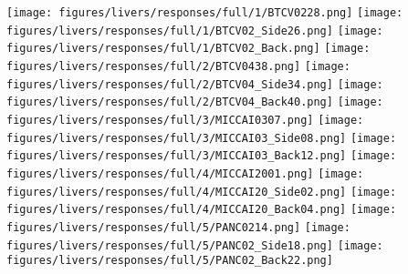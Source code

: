 \documentclass[journal]{IEEEtran}
\begin{document}
\begin{figure*}[tb]
    \centering
        \begin{minipage}[b]{3.5in}
            \captionsetup[subfigure]{labelformat=parens,labelsep=space,font=small}
            \centering
                \vfil
                \texttt{[image: figures/livers/responses/full/1/BTCV0228.png]}
                \texttt{[image: figures/livers/responses/full/1/BTCV02\_Side26.png]}
                \texttt{[image: figures/livers/responses/full/1/BTCV02\_Back.png]}
                \vfil
                \texttt{[image: figures/livers/responses/full/2/BTCV0438.png]}
                \texttt{[image: figures/livers/responses/full/2/BTCV04\_Side34.png]}
                \texttt{[image: figures/livers/responses/full/2/BTCV04\_Back40.png]}
                \vfil
                \texttt{[image: figures/livers/responses/full/3/MICCAI0307.png]}
                \texttt{[image: figures/livers/responses/full/3/MICCAI03\_Side08.png]}
                \texttt{[image: figures/livers/responses/full/3/MICCAI03\_Back12.png]}
                \vfil
                \texttt{[image: figures/livers/responses/full/4/MICCAI2001.png]}
                \texttt{[image: figures/livers/responses/full/4/MICCAI20\_Side02.png]}
                \texttt{[image: figures/livers/responses/full/4/MICCAI20\_Back04.png]}
                \vfil
                \texttt{[image: figures/livers/responses/full/5/PANC0214.png]}
                \texttt{[image: figures/livers/responses/full/5/PANC02\_Side18.png]}
                \texttt{[image: figures/livers/responses/full/5/PANC02\_Back22.png]}
            

\end{minipage}
\end{figure*}
\end{document}
